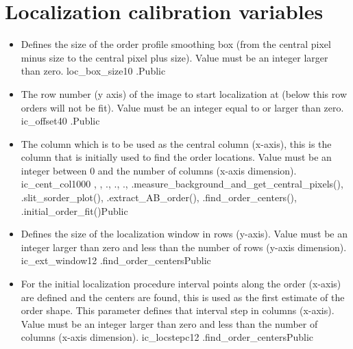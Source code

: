 \clearpage
\newpage
\section{Localization calibration variables}
\label{ch:variables:localization}

\begin{itemize}

\item {}
{Defines the size of the order profile smoothing box (from the central pixel minus size to the central pixel plus size). Value must be an integer larger than zero.}
{loc\_box\_size}{10}
{\callocRAW}{\constantsfile}
{\callocRAW.\progMAIN}{Public}


\item {}
{The row number (y axis) of the image to start localization at (below this row orders will not be fit). Value must be an integer equal to or larger than zero.}
{ic\_offset}{40}
{\callocRAW}{\constantsfile}
{\callocRAW.\progMAIN }{Public}

\item {}
{The column which is to be used as the central column (x-axis), this is the column that is initially used to find the order locations. Value must be an integer between 0 and the number of columns (x-axis dimension).}
{ic\_cent\_col}{1000}
{\callocRAW, \calFFraw, \calextractRAW}{\constantsfile}
{\callocRAW.\progMAIN, \calFFraw.\progMAIN, \calextractRAW.\progMAIN, \spirouBACK.measure\_background\_{\hskip 0pt}and\_get\_central\_pixels(), \spirouPlot.slit\_sorder\_plot(), \spirouEXTOR.extract\_AB\_order(), \spirouLOCOR.find\_order\_centers(), \spirouLOCOR.initial\_order\_fit()}{Public}

\item {}
{Defines the size of the localization window in rows (y-axis). Value must be an integer larger than zero and less than the number of rows (y-axis dimension).}
{ic\_ext\_window}{12}
{\callocRAW}{\constantsfile}
{\spirouLOCOR.find\_order\_centers}{Public}

\item {}
{For the initial localization procedure interval points along the order (x-axis) are defined and the centers are found, this is used as the first estimate of the order shape. This parameter defines that interval step in columns (x-axis). Value must be an integer larger than zero and less than the number of columns (x-axis dimension).}
{ic\_locstepc}{12}
{\callocRAW}{\constantsfile}
{\spirouLOCOR.find\_order\_centers}{Public}


\end{itemize}
